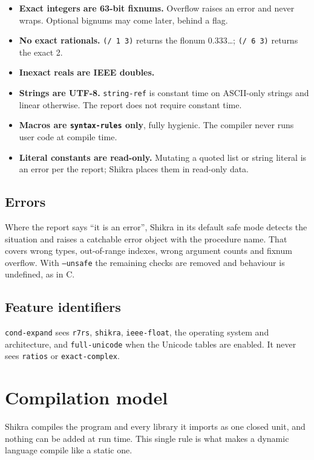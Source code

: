 \documentclass[a4paper,11pt]{article}
\begin{document}
\begin{itemize}
\item \textbf{Exact integers are 63-bit fixnums.} Overflow raises an error
  and never wraps. Optional bignums may come later, behind a flag.
\item \textbf{No exact rationals.} \texttt{(/ 1 3)} returns the flonum
  0.333\ldots; \texttt{(/ 6 3)} returns the exact 2.
\item \textbf{Inexact reals are IEEE doubles.}
\item \textbf{Strings are UTF-8.} \texttt{string-ref} is constant time on
  ASCII-only strings and linear otherwise. The report does not require
  constant time.
\item \textbf{Macros are \texttt{syntax-rules} only}, fully hygienic. The
  compiler never runs user code at compile time.
\item \textbf{Literal constants are read-only.} Mutating a quoted list or
  string literal is an error per the report; Shikra places them in read-only
  data.
\end{itemize}

\subsection{Errors}

Where the report says ``it is an error'', Shikra in its default safe mode
detects the situation and raises a catchable error object with the procedure
name. That covers wrong types, out-of-range indexes, wrong argument counts
and fixnum overflow. With \texttt{--unsafe} the remaining checks are removed
and behaviour is undefined, as in C.

\subsection{Feature identifiers}

\texttt{cond-expand} sees \texttt{r7rs}, \texttt{shikra},
\texttt{ieee-float}, the operating system and architecture, and
\texttt{full-unicode} when the Unicode tables are enabled. It never sees
\texttt{ratios} or \texttt{exact-complex}.

\section{Compilation model}

Shikra compiles the program and every library it imports as one closed unit,
and nothing can be added at run time. This single rule is what makes a
dynamic language compile like a static one.
\end{document}
